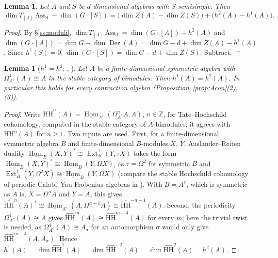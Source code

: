 \documentclass[11pt]{amsart}
\numberwithin{table}{section}
\numberwithin{figure}{section}
\numberwithin{equation}{section}
\newtheorem{lem}[thm]{Lemma}
\theoremstyle{definition}
\theoremstyle{plain}
\newcommand{\HH}{\mathrm{HH}}
\newcommand{\hHH}{\widehat{\mathrm{HH}}}
\newcommand{\Z}{\mathbb{Z}}
\DeclareMathOperator{\Hom}{Hom}
\DeclareMathOperator{\Ext}{Ext}
\DeclareMathOperator{\Der}{Der}
\DeclareMathOperator{\Ass}{Ass}
\begin{document}
\begin{lem}\label{lem:tangent}
Let $A$ and $S$ be $d$-dimensional algebras with $S$ semisimple. Then
\[
\dim T_{[A]}\Ass_d - \dim (G\cdot[S]) = \big(\dim Z(A) - \dim Z(S)\big) + \big(h^2(A) - h^1(A)\big).
\]
\end{lem}

\begin{proof}
By \S\ref{ss:moduli}, $\dim T_{[A]}\Ass_d = \dim (G\cdot[A]) + h^2(A)$ and $\dim (G\cdot[A]) = \dim G - \dim \Der(A) = \dim G - d + \dim Z(A) - h^1(A)$. Since $h^1(S) = 0$, $\dim (G\cdot[S]) = \dim G - d + \dim Z(S)$. Subtract.
\end{proof}

\begin{lem}[{$h^1 = h^2$; \cite[Lemma~2.8]{Pan}, \cite[Thm~3.2.5]{JKM}}]\label{lem:pan}
Let $A$ be a finite-dimensional symmetric algebra with $\Omega^4_{A^e}(A) \cong A$ in the stable category of bimodules. Then $h^1(A) = h^2(A)$. In particular this holds for every contraction algebra (Proposition~\ref{prop:Acon}(2), (3)).
\end{lem}

\begin{proof}
Write $\hHH^n(A) = \underline{\Hom}_{A^e}(\Omega^n_{A^e}A, A)$, $n \in \Z$, for Tate--Hochschild cohomology, computed in the stable category of $A$-bimodules; it agrees with $\HH^n(A)$ for $n \ge 1$. Two inputs are used. First, for a finite-dimensional symmetric algebra $B$ and finite-dimensional $B$-modules $X$, $Y$, Auslander--Reiten duality $\underline{\Hom}_B(X, Y)^* \cong \Ext^1_B(Y, \tau X)$ takes the form $\underline{\Hom}_B(X, Y)^* \cong \underline{\Hom}_B(Y, \Omega X)$, as $\tau = \Omega^2$ for symmetric $B$ and $\Ext^1_B(Y, \Omega^2 X) \cong \underline{\Hom}_B(Y, \Omega X)$ \cite[\S\S1--2]{Lin} (compare the stable Hochschild cohomology of periodic Calabi--Yau Frobenius algebras in \cite{ES}). With $B = A^e$, which is symmetric as $A$ is, $X = \Omega^n A$ and $Y = A$, this gives $\hHH^n(A)^* \cong \underline{\Hom}_{A^e}(A, \Omega^{n+1}A) \cong \hHH^{-n-1}(A)$. Second, the periodicity $\Omega^4_{A^e}(A) \cong A$ gives $\hHH^{m}(A) \cong \hHH^{m+4}(A)$ for every $m$; here the trivial twist is needed, as $\Omega^4_{A^e}(A) \cong A_\sigma$ for an automorphism $\sigma$ would only give $\hHH^{m+4}(A, A_\sigma)$. Hence $h^1(A) = \dim \hHH^1(A) = \dim \hHH^{-2}(A) = \dim \hHH^{2}(A) = h^2(A)$.
\end{proof}
\end{document}
